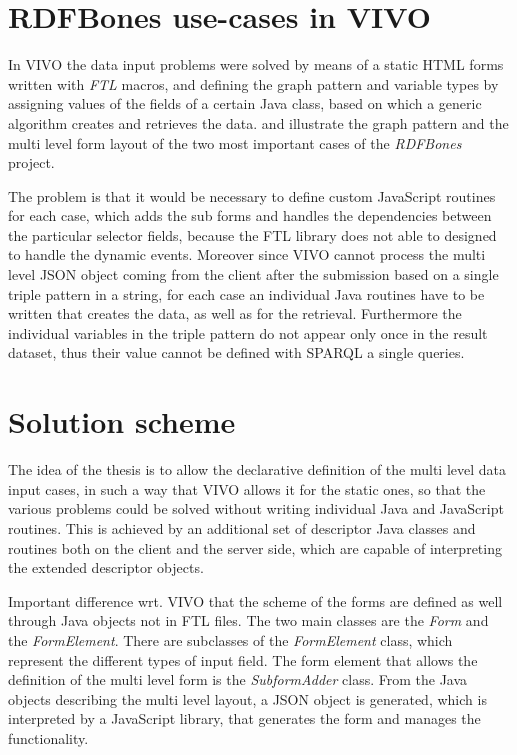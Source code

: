 \section{RDFBones use-cases in VIVO}

In VIVO the data input problems were solved by means of a static HTML forms written with \textit{FTL} macros, and defining the graph pattern and variable types by assigning values of the fields of a certain Java class, based on which a generic algorithm creates and retrieves the data.  and  illustrate the graph pattern and the multi level form layout of the two most important cases of the \textit{RDFBones} project. 



The problem is that it would be necessary to define custom JavaScript routines for each case, which adds the sub forms and handles the dependencies between the particular selector fields, because the FTL library does not able to designed to handle the dynamic events. Moreover since VIVO cannot process the multi level JSON object coming from the client after the submission based on a single triple pattern in a string, for each case an individual Java routines have to be written that creates the data, as well as for the retrieval. Furthermore the individual variables in the triple pattern do not appear only once in the result dataset, thus their value cannot be defined with SPARQL a single queries. 

\section{Solution scheme}

The idea of the thesis is to allow the declarative definition of the multi level data input cases, in such a way that VIVO allows it for the static ones, so that the various problems could be solved without writing individual Java and JavaScript routines. This is achieved by an additional set of descriptor Java classes and routines both on the client and the server side, which are capable of interpreting the extended descriptor objects.

Important difference wrt. VIVO that the scheme of the forms are defined as well through Java objects not in FTL files. The two main classes are the \textit{Form} and the \textit{FormElement}. There are subclasses of the \textit{FormElement} class, which represent the different types of input field. The form element that allows the definition of the multi level form is the \textit{SubformAdder} class. From the Java objects describing the multi level layout, a JSON object is generated, which is interpreted by a JavaScript library, that generates the form and manages the functionality.

